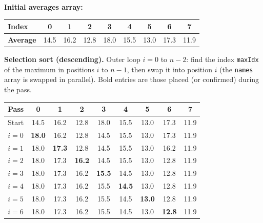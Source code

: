 \documentclass[11pt]{article}
\begin{document}
\begin{exemplebox}
\textbf{Initial averages array:}
\begin{center}
\begin{tabular}{|l|c|c|c|c|c|c|c|c|}
\hline
\rowcolor{popblueL}\textbf{Index} & 0 & 1 & 2 & 3 & 4 & 5 & 6 & 7 \\
\hline
\textbf{Average} & 14.5 & 16.2 & 12.8 & 18.0 & 15.5 & 13.0 & 17.3 & 11.9 \\
\hline
\end{tabular}
\end{center}

\noindent\textbf{Selection sort (descending).} Outer loop $i = 0$ to $n-2$: find the index \texttt{maxIdx} of the maximum in positions $i$ to $n-1$, then swap it into position $i$ (the \texttt{names} array is swapped in parallel). Bold entries are those placed (or confirmed) during the pass.

\begin{center}
\begin{tabular}{|c|c|c|c|c|c|c|c|c|}
\hline
\rowcolor{popblueL}\textbf{Pass} & 0 & 1 & 2 & 3 & 4 & 5 & 6 & 7 \\
\hline
Start & 14.5 & 16.2 & 12.8 & 18.0 & 15.5 & 13.0 & 17.3 & 11.9 \\
\hline
$i=0$ & \textbf{18.0} & 16.2 & 12.8 & 14.5 & 15.5 & 13.0 & 17.3 & 11.9 \\
$i=1$ & 18.0 & \textbf{17.3} & 12.8 & 14.5 & 15.5 & 13.0 & 16.2 & 11.9 \\
$i=2$ & 18.0 & 17.3 & \textbf{16.2} & 14.5 & 15.5 & 13.0 & 12.8 & 11.9 \\
$i=3$ & 18.0 & 17.3 & 16.2 & \textbf{15.5} & 14.5 & 13.0 & 12.8 & 11.9 \\
$i=4$ & 18.0 & 17.3 & 16.2 & 15.5 & \textbf{14.5} & 13.0 & 12.8 & 11.9 \\
$i=5$ & 18.0 & 17.3 & 16.2 & 15.5 & 14.5 & \textbf{13.0} & 12.8 & 11.9 \\
$i=6$ & 18.0 & 17.3 & 16.2 & 15.5 & 14.5 & 13.0 & \textbf{12.8} & 11.9 \\
\hline
\end{tabular}
\end{center}


\end{exemplebox}
\end{document}
